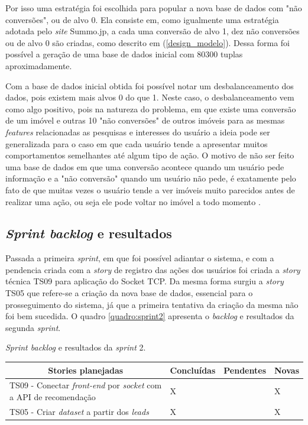 Por isso uma estratégia foi escolhida para popular a nova base de dados com "não conversões", ou de alvo 0. Ela consiste em, como igualmente uma estratégia adotada pelo \textit{site} Summo.jp, a cada uma conversão de alvo 1, dez não conversões ou de alvo 0 são criadas, como descrito em (\ref{design_modelo}). Dessa forma foi possível a geração de uma base de dados inicial com 80300 tuplas aproximadamente.

Com a base de dados inicial obtida foi possível notar um desbalanceamento dos dados, pois existem mais alvos 0 do que 1. Neste caso, o desbalanceamento vem como algo positivo, pois na natureza do problema, em que existe uma conversão de um imóvel e outras 10 "não conversões" de outros imóveis para as mesmas \textit{features} relacionadas as pesquisas e interesses do usuário a ideia pode ser generalizada para o caso em que cada usuário tende a apresentar muitos comportamentos semelhantes até algum tipo de ação. O motivo de não ser feito uma base de dados em que uma conversão acontece quando um usuário pede informação e a "não conversão" quando um usuário não pede, é exatamente pelo fato de que muitas vezes o usuário tende a ver imóveis muito parecidos antes de realizar uma ação, ou seja ele pode voltar no imóvel a todo momento \cite{Summo:2017}.

\subsection{\textit{Sprint backlog} e resultados}

Passada a primeira \textit{sprint}, em que foi possível adiantar o sistema, e com a pendencia criada com a \textit{story} de registro das ações dos usuários foi criada a \textit{story} técnica TS09 para aplicação do Socket TCP. Da mesma forma surgiu a \textit{story} TS05 que refere-se a criação da nova base de dados, essencial para o prosseguimento do sistema, já que a primeira tentativa da criação da mesma não foi bem sucedida. O quadro \ref{quadro:sprint2} apresenta o \textit{backlog} e resultados da segunda  \textit{sprint}.

\begin{quadro}[H]
\centering
\caption[\textit{Sprint backlog} e resultados da \textit{sprint} 2]{\textit{Sprint backlog} e resultados da \textit{sprint} 2.}
\label{quadro:sprint2}
\begin{tabular}{|p{6cm}|p{2cm}|p{2cm}|p{1cm}|}
\hline
\multicolumn{1}{|c|}{\textbf{Stories planejadas}} & \multicolumn{1}{c|}{\textbf{Concluídas}} & \multicolumn{1}{c|}{\textbf{Pendentes}} & \multicolumn{1}{c|}{\textbf{Novas}} \\ \hline
TS09 - Conectar \textit{front-end} por \textit{socket} com a API de recomendação & X &  & X \\ \hline
TS05 - Criar \textit{dataset} a partir dos \textit{leads} & X &  & X \\ \hline
\end{tabular}
\end{quadro}


